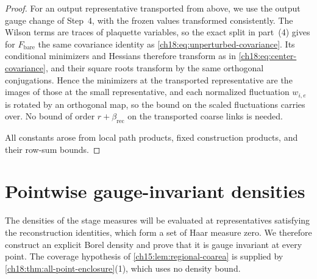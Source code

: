 \begin{proof}
For an output representative transported from above, we use the output gauge change of Step~4, with the frozen values transformed consistently. The Wilson terms are traces of plaquette variables, so the exact split in part~(4) gives for $F_{\mathrm{bare}}$ the same covariance identity as \eqref{ch18:eq:unperturbed-covariance}. Its conditional minimizers and Hessians therefore transform as in \eqref{ch18:eq:center-covariance}, and their square roots transform by the same orthogonal conjugations. Hence the minimizers at the transported representative are the images of those at the small representative, and each normalized fluctuation $w_{i,e}$ is rotated by an orthogonal map, so the bound on the scaled fluctuations carries over. No bound of order $r+\beta_{\mathrm{rec}}$ on the transported coarse links is needed.

All constants arose from local path products, fixed construction products, and their row-sum bounds.
\end{proof}

\section{Pointwise gauge-invariant densities}\label{ch18:sec:densities}

The densities of the stage measures will be evaluated at representatives satisfying the reconstruction identities, which form a set of Haar measure zero. We therefore construct an explicit Borel density and prove that it is gauge invariant at every point. The coverage hypothesis of \cref{ch15:lem:regional-coarea} is supplied by \cref{ch18:thm:all-point-enclosure}(1), which uses no density bound.

